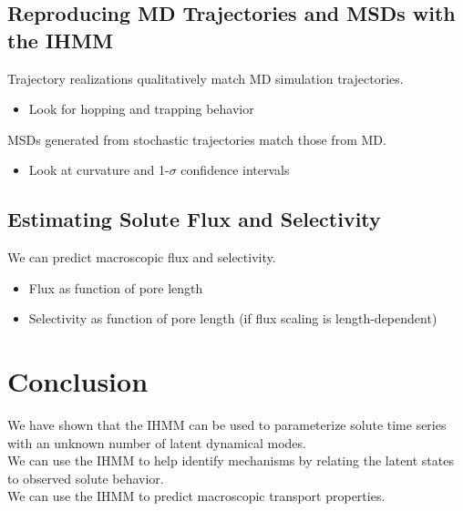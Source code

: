 \documentclass{article}
\begin{document}
  \subsection{Reproducing MD Trajectories and MSDs with the IHMM}
  
  \noindent Trajectory realizations qualitatively match MD simulation trajectories.

  \begin{itemize}
    \item Look for hopping and trapping behavior
  \end{itemize}
  
  \noindent MSDs generated from stochastic trajectories match those from MD.
  \begin{itemize}
  	\item Look at curvature and 1-$\sigma$ confidence intervals
  \end{itemize}
  
  \subsection{Estimating Solute Flux and Selectivity}  
  
  \noindent We can predict macroscopic flux and selectivity.
  \begin{itemize}
  	\item Flux as function of pore length
  	\item Selectivity as function of pore length (if flux scaling is length-dependent)
  \end{itemize}
 
  \section{Conclusion}
  
  \noindent We have shown that the IHMM can be used to parameterize solute time series
  with an unknown number of latent dynamical modes. \\
  
  \noindent We can use the IHMM to help identify mechanisms by relating the latent
  states to observed solute behavior. \\
  
  \noindent We can use the IHMM to predict macroscopic transport properties. \\
  
\end{document}
